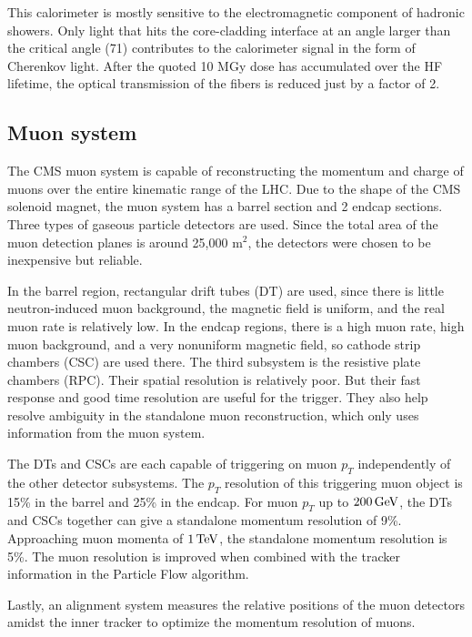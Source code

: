This calorimeter is mostly sensitive to the electromagnetic component of hadronic showers.
Only light that hits the core-cladding interface at an angle larger than the critical angle (71\textdegree) contributes to the calorimeter signal in the form of Cherenkov light. 
After the quoted 10 MGy dose has accumulated over the HF lifetime, the optical transmission of the fibers is reduced just by a factor of 2.

\subsection{Muon system}
The CMS muon system is capable of reconstructing the momentum and charge of muons over the entire
kinematic range of the LHC. 
Due to the shape of the CMS solenoid magnet, the muon system has a barrel section and 2 endcap sections.
Three types of gaseous particle detectors are used.
Since the total area of the muon detection planes is around 25,000 $\textrm{m}^2$, the 
detectors were chosen to be inexpensive but reliable.

In the barrel region, rectangular drift tubes (DT) are used, 
since there is little neutron-induced muon background, the magnetic field is uniform,
and the real muon rate is relatively low.
In the endcap regions, there is a high muon rate, high muon background, and a
very nonuniform magnetic field, so cathode strip chambers (CSC) are used there.
The third subsystem is the resistive plate chambers (RPC). Their spatial resolution is relatively poor.
But their fast response and good time resolution are useful for the trigger.
They also help resolve ambiguity in the standalone muon reconstruction,
which only uses information from the muon system.

The DTs and CSCs are each capable of triggering on muon $p_T$ independently of the other detector subsystems.
The $p_T$ resolution of this triggering muon object is 15\% in the barrel and 25\% in the endcap.
For muon $p_T$ up to $200 \,\text{Ge\hspace{-.08em}V}$, the DTs and CSCs together can give a standalone momentum resolution of 9\%.
Approaching muon momenta of $1 \,\text{Te\hspace{-.08em}V}$, the standalone momentum resolution is 5\%.
The muon resolution is improved when combined with the tracker information in the Particle Flow algorithm.

Lastly, an alignment system measures the relative positions of the muon detectors amidst the inner tracker to optimize the momentum resolution of muons.


